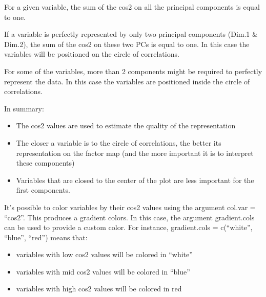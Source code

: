 \documentclass[]{book}
\newenvironment{Shaded}{\begin{snugshade}}{\end{snugshade}}
\newcommand{\CommentTok}[1]{\textcolor[rgb]{0.56,0.35,0.01}{\textit{#1}}}
\newcommand{\DataTypeTok}[1]{\textcolor[rgb]{0.13,0.29,0.53}{#1}}
\newcommand{\KeywordTok}[1]{\textcolor[rgb]{0.13,0.29,0.53}{\textbf{#1}}}
\newcommand{\NormalTok}[1]{#1}
\newcommand{\OtherTok}[1]{\textcolor[rgb]{0.56,0.35,0.01}{#1}}
\newcommand{\StringTok}[1]{\textcolor[rgb]{0.31,0.60,0.02}{#1}}
\providecommand{\tightlist}{%
  \setlength{\itemsep}{0pt}\setlength{\parskip}{0pt}}
\begin{document}
For a given variable, the sum of the cos2 on all the principal components is equal to one.

If a variable is perfectly represented by only two principal components (Dim.1 \& Dim.2), the sum of the cos2 on these two PCs is equal to one. In this case the variables will be positioned on the circle of correlations.

For some of the variables, more than 2 components might be required to perfectly represent the data. In this case the variables are positioned inside the circle of correlations.

In summary:

\begin{itemize}
\tightlist
\item
  The cos2 values are used to estimate the quality of the representation
\item
  The closer a variable is to the circle of correlations, the better its representation on the factor map (and the more important it is to interpret these components)
\item
  Variables that are closed to the center of the plot are less important for the first components.
\end{itemize}

It's possible to color variables by their cos2 values using the argument col.var = ``cos2''. This produces a gradient colors. In this case, the argument gradient.cols can be used to provide a custom color. For instance, gradient.cols = c(``white'', ``blue'', ``red'') means that:

\begin{itemize}
\tightlist
\item
  variables with low cos2 values will be colored in ``white''
\item
  variables with mid cos2 values will be colored in ``blue''
\item
  variables with high cos2 values will be colored in red
\end{itemize}

\begin{Shaded}
\end{Shaded}
\end{document}
